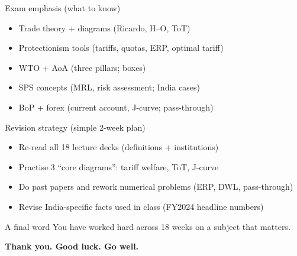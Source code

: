 \documentclass[
  ignorenonframetext,
  aspectratio=169,
]{beamer}
\makeatletter
\providecommand{\tightlist}{%
  \setlength{\itemsep}{0pt}\setlength{\parskip}{0pt}}
\let\quarto@originallabel\label
\DeclareRobustCommand*{\label}[1]{\quarto@originallabel{#1}}
\makeatother
\begin{document}
\begin{frame}
\begin{block}{Exam emphasis (what to know)}
\label{exam-emphasis-what-to-know}
\begin{itemize}
\tightlist
\item
  Trade theory + diagrams (Ricardo, H--O, ToT)
\item
  Protectionism tools (tariffs, quotas, ERP, optimal tariff)
\item
  WTO + AoA (three pillars; boxes)
\item
  SPS concepts (MRL, risk assessment; India cases)
\item
  BoP + forex (current account, J-curve; pass-through)
\end{itemize}
\end{block}
\end{frame}

\begin{frame}
\begin{block}{Revision strategy (simple 2-week plan)}
\label{revision-strategy-simple-2-week-plan}
\begin{itemize}
\tightlist
\item
  Re-read all 18 lecture decks (definitions + institutions)
\item
  Practise 3 ``core diagrams'': tariff welfare, ToT, J-curve
\item
  Do past papers and rework numerical problems (ERP, DWL, pass-through)
\item
  Revise India-specific facts used in class (FY2024 headline numbers)
\end{itemize}
\end{block}
\end{frame}

\begin{frame}
\begin{block}{A final word}
\label{a-final-word}
You have worked hard across 18 weeks on a subject that matters.

\textbf{Thank you. Good luck. Go well.}
\end{block}
\end{frame}
\end{document}
